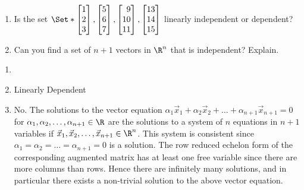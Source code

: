 \begin{exercises}
\begin{problist}
\begin{enumerate}
			\item Is the set $\Set*{\mat{1\\2\\3},\mat{5\\6\\7},
				\mat{9\\10\\11}, \mat{13\\14\\15}}$ linearly
			independent or dependent?
			
			\item Can you find a set of $n+1$ vectors in $\R^{n}$ that is independent? Explain.
		\end{enumerate}
		\begin{solution}
			\begin{enumerate}
				\item
				\item Linearly Dependent
				\item No. The solutions to the vector equation
				$\alpha_{1}\vec x_{1}+\alpha_{2}\vec x_{2}+\ldots+\alpha_{n+1}\vec x_{n+1}=0$
				for $\alpha_{1},\alpha_{2},\ldots,\alpha_{n+1} \in \R$
				are the solutions to a system of $n$ equations
				in $n+1$ variables if $\vec x_1,\vec x_2,\ldots,\vec x_{n+1}\in
				\R^n$. This system is consistent
				since
				$\alpha_{1}=\alpha_{2}=\ldots=\alpha_{n+1}=0$
				is a solution. The row reduced echelon form
				of the corresponding augmented matrix has at
				least one free variable since there are more
				columns than rows. Hence there are
				infinitely many solutions, and in particular
				there exists a non-trivial solution to the
				above vector equation.
			\end{enumerate}
		\end{solution}
		

\end{problist}
\end{exercises}
